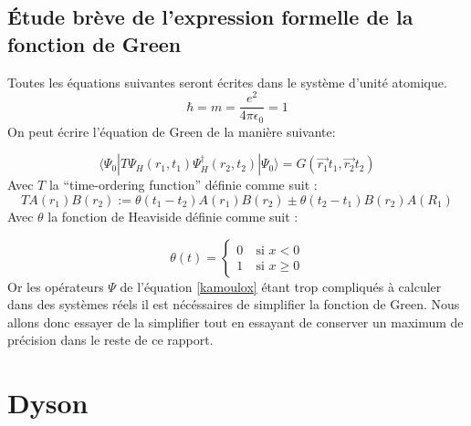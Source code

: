 \documentclass[12pt]{article}
\begin{document}
\subsection{\'Etude br\`eve de l'expression formelle de la fonction de Green}
Toutes les \'equations suivantes seront \'ecrites dans le syst\`eme d'unit\'e atomique.
\begin{equation}
 \hbar = m = \frac{e^2}{4 \pi \epsilon_0} = 1
\end{equation}
On peut \'ecrire l'\'equation de Green de la mani\`ere suivante:

\begin{equation}
\label{kamoulox}
 \langle \Psi_0 | T \Psi_H (r_1, t_1) \Psi_H^\dagger (r_2, t_2) | \Psi_0 \rangle = G(\vec{r_1} t_1, \vec{r_2}  t_2)
\end{equation}
Avec $T$ la ``time-ordering function'' d\'efinie comme suit :
\begin{equation}
 T{A(r_1)B(r_2)} := \theta(t_1 - t_2)A(r_1)B(r_2) \pm \theta(t_2 - t_1)B(r_2) A(R_1)
\end{equation}
Avec $\theta$ la fonction de Heaviside d\'efinie comme suit :

\begin{equation}
\theta(t) = 
\left\{ \begin{array}{rl}
 0 &\ \text{si }x <0\\
 1 &\ \text{si }x \geq 0

\end{array} \right.
\end{equation}
Or les op\'erateurs $\Psi$ de l'\'equation \ref{kamoulox} \'etant trop compliqu\'es \`a calculer dans des syst\`emes r\'eels il est n\'ec\'essaires de simplifier la fonction de Green.
Nous allons donc essayer de la simplifier tout en essayant de conserver un maximum de pr\'ecision dans le reste de ce rapport.
\section{Dyson}
\end{document}

